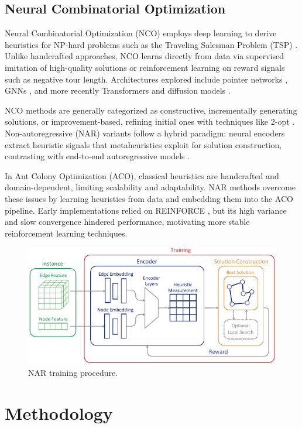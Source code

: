\documentclass[a4paper,conference]{IEEEtran}
\begin{document}
\subsection{Neural Combinatorial Optimization}
Neural Combinatorial Optimization (NCO) employs deep learning to derive heuristics for NP-hard problems such as the Traveling Salesman Problem (TSP) \cite{MLCO}. Unlike handcrafted approaches, NCO learns directly from data via supervised imitation of high-quality solutions or reinforcement learning on reward signals such as negative tour length. Architectures explored include pointer networks \cite{pointernetwork}, GNNs \cite{gnn}, and more recently Transformers \cite{transformer} and diffusion models \cite{difusco}.

NCO methods are generally categorized as constructive, incrementally generating solutions, or improvement-based, refining initial ones with techniques like 2-opt \cite{NCO}. Non-autoregressive (NAR) variants follow a hybrid paradigm: neural encoders extract heuristic signals that metaheuristics exploit for solution construction, contrasting with end-to-end autoregressive models \cite{RL4CO}.

In Ant Colony Optimization (ACO), classical heuristics are handcrafted and domain-dependent, limiting scalability and adaptability. NAR methods overcome these issues by learning heuristics from data and embedding them into the ACO pipeline. Early implementations relied on REINFORCE \cite{REINFORCE}, but its high variance and slow convergence hindered performance, motivating more stable reinforcement learning techniques.

\begin{figure}[!tb]
  \centering
  \includegraphics[width=\linewidth]{DACO.pdf}
  \caption{NAR training procedure.}
  \label{fig:DACO}
\end{figure}

\section{Methodology}
\end{document}
